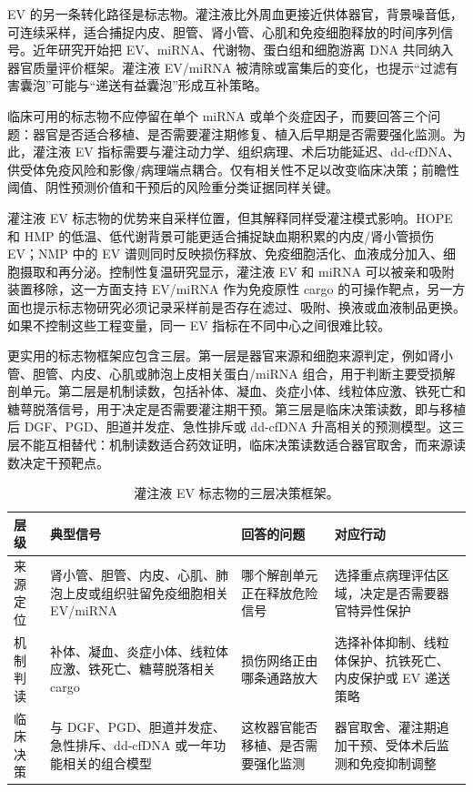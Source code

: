 \documentclass[11pt,a4paper]{article}
\begin{document}
EV
的另一条转化路径是标志物。灌注液比外周血更接近供体器官，背景噪音低，可连续采样，适合捕捉内皮、胆管、肾小管、心肌和免疫细胞释放的时间序列信号。近年研究开始把
EV、miRNA、代谢物、蛋白组和细胞游离 DNA
共同纳入器官质量评价框架\cite{alectinaffinity2025, abiomarkerframework2024, massspectrometrybased2023}。灌注液
EV/miRNA
被清除或富集后的变化，也提示``过滤有害囊泡''可能与``递送有益囊泡''形成互补策略\cite{thehemopurifierremoves2024}。

临床可用的标志物不应停留在单个 miRNA
或单个炎症因子，而要回答三个问题：器官是否适合移植、是否需要灌注期修复、植入后早期是否需要强化监测。为此，灌注液
EV
指标需要与灌注动力学、组织病理、术后功能延迟、dd-cfDNA、供受体免疫风险和影像/病理端点耦合。仅有相关性不足以改变临床决策；前瞻性阈值、阴性预测价值和干预后的风险重分类证据同样关键。

灌注液 EV 标志物的优势来自采样位置，但其解释同样受灌注模式影响。HOPE
和 HMP 的低温、低代谢背景可能更适合捕捉缺血期积累的内皮/肾小管损伤 EV；NMP
中的 EV 谱则同时反映损伤释放、免疫细胞活化、血液成分加入、细胞摄取和再分泌。控制性复温研究显示，灌注液 EV
和 miRNA 可以被亲和吸附装置移除，这一方面支持 EV/miRNA
作为免疫原性 cargo 的可操作靶点，另一方面也提示标志物研究必须记录采样前是否存在滤过、吸附、换液或血液制品更换\cite{alectinaffinity2025, thehemopurifierremoves2024}。如果不控制这些工程变量，同一 EV
指标在不同中心之间很难比较。

更实用的标志物框架应包含三层。第一层是器官来源和细胞来源判定，例如肾小管、胆管、内皮、心肌或肺泡上皮相关蛋白/miRNA
组合，用于判断主要受损解剖单元。第二层是机制读数，包括补体、凝血、炎症小体、线粒体应激、铁死亡和糖萼脱落信号，用于决定是否需要灌注期干预。第三层是临床决策读数，即与移植后
DGF、PGD、胆道并发症、急性排斥或 dd-cfDNA
升高相关的预测模型\cite{molecularimmunemonitoring2023, newperspectiveson2022, systematicreviewof2024}。这三层不能互相替代：机制读数适合药效证明，临床决策读数适合器官取舍，而来源读数决定干预靶点。

\begin{table}[htbp]
\centering
\small
\caption{灌注液 EV 标志物的三层决策框架。}
\begin{tabularx}{\textwidth}{p{}YYY}
\toprule
层级 & 典型信号 & 回答的问题 & 对应行动 \\
\midrule
来源定位 & 肾小管、胆管、内皮、心肌、肺泡上皮或组织驻留免疫细胞相关 EV/miRNA & 哪个解剖单元正在释放危险信号 & 选择重点病理评估区域，决定是否需要器官特异性保护 \\
机制判读 & 补体、凝血、炎症小体、线粒体应激、铁死亡、糖萼脱落相关 cargo & 损伤网络正由哪条通路放大 & 选择补体抑制、线粒体保护、抗铁死亡、内皮保护或 EV 递送策略 \\
临床决策 & 与 DGF、PGD、胆道并发症、急性排斥、dd-cfDNA 或一年功能相关的组合模型 & 这枚器官能否移植、是否需要强化监测 & 器官取舍、灌注期追加干预、受体术后监测和免疫抑制调整 \\
\bottomrule
\end{tabularx}
\end{table}
\end{document}
